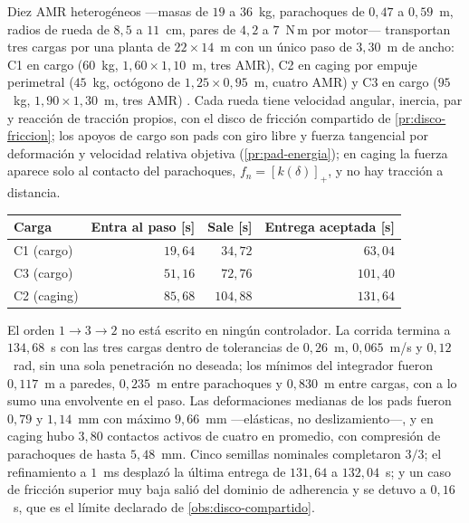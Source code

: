 \begin{observacion}
\label{obs:ensayo-mixed2d}
Diez AMR heterogéneos —masas de $19$ a $36$~kg, parachoques de $0{,}47$ a
$0{,}59$~m, radios de rueda de $8{,}5$ a $11$~cm, pares de $4{,}2$ a $7$~N\,m
por motor— transportan tres cargas por una planta de $22\times14$~m con un
único paso de $3{,}30$~m de ancho: C1 en \textsf{cargo} ($60$~kg,
$1{,}60\times1{,}10$~m, tres AMR), C2 en \textsf{caging} por empuje perimetral
($45$~kg, octógono de $1{,}25\times0{,}95$~m, cuatro AMR) y C3 en
\textsf{cargo} ($95$~kg, $1{,}90\times1{,}30$~m, tres AMR)
\cite{mayorga2026compendio}. Cada rueda tiene velocidad angular, inercia, par
y reacción de tracción propios, con el disco de fricción compartido de
\cref{pr:disco-friccion}; los apoyos de \textsf{cargo} son pads con giro
libre y fuerza tangencial por deformación y velocidad relativa objetiva
(\cref{pr:pad-energia}); en \textsf{caging} la fuerza aparece solo al contacto
del parachoques, $f_n=[k(\delta)]_+$, y no hay tracción a distancia.

\begin{center}\small
\begin{tabular}{@{}lrrr@{}}
\toprule
Carga & Entra al paso [s] & Sale [s] & Entrega aceptada [s] \\
\midrule
C1 (\textsf{cargo}) & $19{,}64$ & $34{,}72$ & $63{,}04$ \\
C3 (\textsf{cargo}) & $51{,}16$ & $72{,}76$ & $101{,}40$ \\
C2 (\textsf{caging}) & $85{,}68$ & $104{,}88$ & $131{,}64$ \\
\bottomrule
\end{tabular}
\end{center}

El orden $1\to3\to2$ no está escrito en ningún controlador. La corrida termina
a $134{,}68$~s con las tres cargas dentro de tolerancias de $0{,}26$~m,
$0{,}065$~m/s y $0{,}12$~rad, sin una sola penetración no deseada; los mínimos
del integrador fueron $0{,}117$~m a paredes, $0{,}235$~m entre parachoques y
$0{,}830$~m entre cargas, con a lo sumo una envolvente en el paso. Las
deformaciones medianas de los pads fueron $0{,}79$ y $1{,}14$~mm con máximo
$9{,}66$~mm —elásticas, no deslizamiento—, y en \textsf{caging} hubo $3{,}80$
contactos activos de cuatro en promedio, con compresión de parachoques de
hasta $5{,}48$~mm. Cinco semillas nominales completaron $3/3$; el
refinamiento a $1$~ms desplazó la última entrega de $131{,}64$ a
$132{,}04$~s; y un caso de fricción superior muy baja salió del dominio de
adherencia y se detuvo a $0{,}16$~s, que es el límite declarado de
\cref{obs:disco-compartido}.
\end{observacion}

